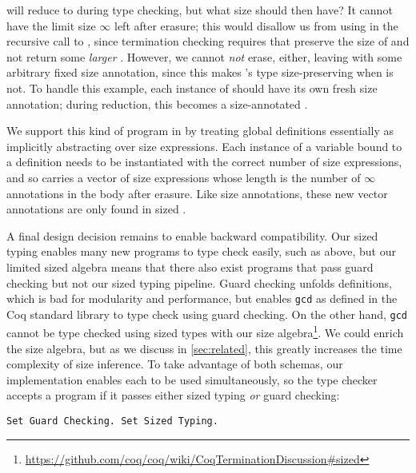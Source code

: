  will reduce to  during type checking, but what size should  then have?
It cannot have the limit size $\infty$ left after erasure; this would disallow us from using  in the recursive call to , since termination checking requires that  preserve the size of  and not return some \emph{larger} .
However, we cannot \textit{not} erase, either, leaving  with some arbitrary fixed size annotation, since this makes 's type size-preserving when  is not.
To handle this example, each instance of  should have its own fresh size annotation; during reduction, this becomes a size-annotated .

We support this kind of program in \lang by treating global definitions essentially as implicitly abstracting over size expressions.
Each instance of a variable bound to a definition needs to be instantiated with the correct number of size expressions, and so carries a vector of size expressions whose length is the number of $\infty$ annotations in the body after erasure.
Like size annotations, these new vector annotations are only found in sized \lang.

A final design decision remains to enable backward compatibility.
Our sized typing enables many new programs to type check easily, such as  above, but our limited sized algebra means that there also exist programs that pass guard checking but not our sized typing pipeline.
Guard checking unfolds definitions, which is bad for modularity and performance, but enables \texttt{gcd} as defined in the Coq standard library to type check using guard checking.
On the other hand, \texttt{gcd} cannot be type checked using sized types with our size algebra\footnote{\url{https://github.com/coq/coq/wiki/CoqTerminationDiscussion\#sized}}.
We could enrich the size algebra, but as we discuss in \autoref{sec:related}, this greatly increases the time complexity of size inference.
To take advantage of both schemas, our implementation enables each to be used simultaneously, so the type checker accepts a program if it passes either sized typing \textit{or} guard checking:

\begin{verbatim}
Set Guard Checking. Set Sized Typing.
\end{verbatim}
